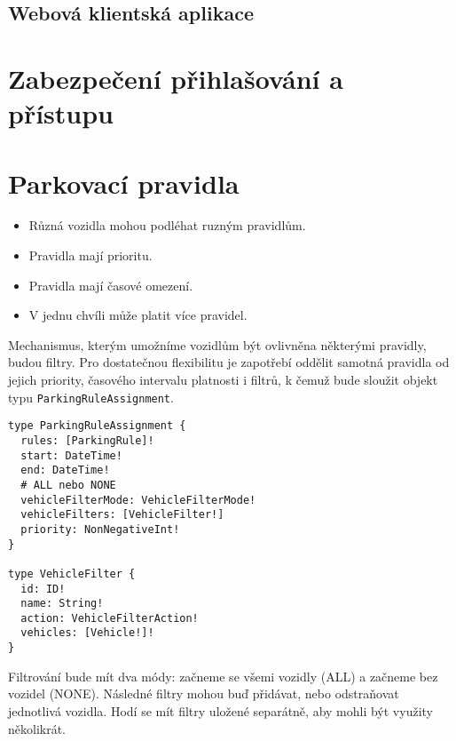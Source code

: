 \subsection{Webová klientská aplikace}


\section{Zabezpečení přihlašování a přístupu} \label{db_schema}


\section{Parkovací pravidla} \label{analysis_parking_schema}

\begin{itemize}
  \item Různá vozidla mohou podléhat ruzným pravidlům.
  \item Pravidla mají prioritu.
  \item Pravidla mají časové omezení.
  \item V jednu chvíli může platit více pravidel.
\end{itemize}

Mechanismus, kterým umožníme vozidlům být ovlivněna některými pravidly,
budou filtry.
Pro dostatečnou flexibilitu je zapotřebí oddělit samotná pravidla od jejich
priority, časového intervalu platnosti i filtrů,
k čemuž bude sloužit objekt typu \texttt{ParkingRuleAssignment}.

\begin{lstlisting}
type ParkingRuleAssignment {
  rules: [ParkingRule]!
  start: DateTime!
  end: DateTime!
  # ALL nebo NONE
  vehicleFilterMode: VehicleFilterMode!
  vehicleFilters: [VehicleFilter!]
  priority: NonNegativeInt!
}

type VehicleFilter {
  id: ID!
  name: String!
  action: VehicleFilterAction!
  vehicles: [Vehicle!]!
}
\end{lstlisting}

Filtrování bude mít dva módy: začneme se všemi vozidly (ALL) a začneme bez vozidel (NONE).
Následné filtry mohou buď přidávat, nebo odstraňovat jednotlivá vozidla.
Hodí se mít filtry uložené separátně, aby mohli být využity několikrát.

